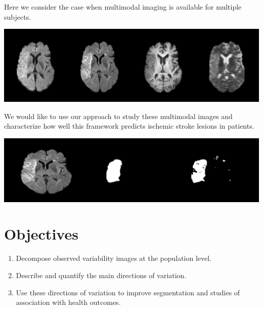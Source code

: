\documentclass[a0,landscape]{a0poster}
\begin{document}
\begin{multicols}{3}
\noindent Here we consider the case when multimodal imaging is available for multiple subjects. 
\begin{center}\vspace{.25cm}
\includegraphics[width=1\linewidth]{image_ex.pdf}
\end{center}\vspace{.5cm}

\noindent We would like to use our approach to study these multimodal images and characterize how well this framework predicts ischemic stroke lesions in patients.

\begin{center}\vspace{.25cm}
\includegraphics[width=1\linewidth]{seg.pdf}
\end{center}\vspace{.5cm}
\large{\section*{\color{uwred}Objectives}}
\begin{enumerate}
\item  Decompose observed variability images at the population level.
\item Describe and quantify the main directions of variation.
\item Use these directions of variation to improve segmentation and studies of association with health outcomes.
\end{enumerate}


\end{multicols}
\end{document}
